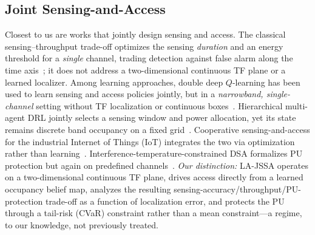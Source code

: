 \subsection{Joint Sensing-and-Access}
Closest to us are works that jointly design sensing and access. The classical
sensing--throughput trade-off optimizes the sensing \emph{duration} and an
energy threshold for a \emph{single} channel, trading detection against
false alarm along the time axis~\cite{liang2008sensing}; it does not address
a two-dimensional continuous TF plane or a learned localizer. Among learning
approaches, double deep $Q$-learning has been used to learn sensing and
access policies jointly, but in a \emph{narrowband, single-channel} setting
without TF localization or continuous boxes~\cite{bokobza2023ddqsa}.
Hierarchical multi-agent DRL jointly selects a sensing window and power
allocation, yet its state remains discrete band occupancy on a fixed
grid~\cite{li2024hmadrl}. Cooperative sensing-and-access for the industrial
Internet of Things (IoT) integrates the two via optimization rather than
learning~\cite{liu2023ciiot}.
Interference-temperature-constrained DSA formalizes PU protection but again
on predefined channels~\cite{xing2007dsa}. \emph{Our distinction:} LA-JSSA
operates on a two-dimensional continuous TF plane, drives access directly
from a learned occupancy belief map, analyzes the resulting
sensing-accuracy/throughput/PU-protection trade-off as a function of
localization error, and protects the PU through a tail-risk (CVaR) constraint
rather than a mean constraint---a regime, to our knowledge, not previously
treated.
